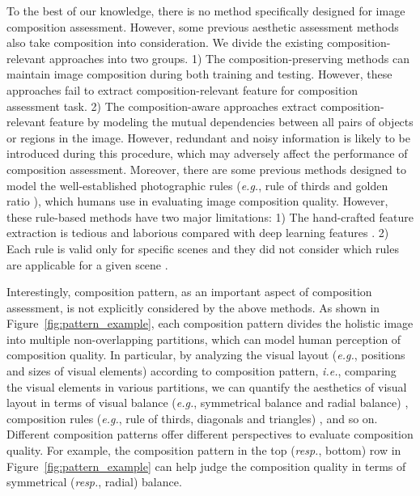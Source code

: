 \documentclass{bmvc2k}
\begin{document}
To the best of our knowledge, there is no method specifically designed for image composition assessment. However, some previous aesthetic assessment methods also take composition into consideration. We divide the existing composition-relevant approaches into two groups. 1) The composition-preserving methods \cite{Mai2016CompositionPreservingDP, Chen2020AdaptiveFD} can maintain image composition during both training and testing. However, these approaches fail to extract composition-relevant feature for composition assessment task. 2) The composition-aware approaches \cite{Liu2020CompositionAwareIA, Ma2017ALampAL, Wang2019ModelingHP} extract composition-relevant feature by modeling the mutual dependencies between all pairs of objects or regions in the image. However, redundant and noisy information is likely to be introduced during this procedure, which may adversely affect the performance of composition assessment. Moreover, there are some previous methods \cite{wu2017high,Dhar2011HighLD,Bhattacharya2010AFF,wu2010good,Tang2013ContentBasedPQ,liu2010optimizing} designed to model the well-established photographic rules (\emph{e.g.}, rule of thirds and golden ratio \cite{joshi2011aesthetics}), which humans use in evaluating image composition quality. 
\textcolor[rgb]{0,0,0}{However, these rule-based methods have two major limitations: 1) The hand-crafted feature extraction is tedious and laborious compared with deep learning features \cite{li2020novel}. 2) Each rule is valid only for specific scenes and they did not consider which rules are applicable for a given scene \cite{su2021camera}. }

Interestingly, composition pattern, as an important aspect of composition assessment, is not explicitly considered by the above methods. As shown in Figure~\ref{fig:pattern_example}, each composition pattern divides the holistic image into multiple non-overlapping partitions, which can model human perception of composition quality. In particular, by analyzing the visual layout (\emph{e.g.}, positions and sizes of visual elements) according to composition pattern, \emph{i.e.}, comparing the visual elements in various partitions, we can quantify the aesthetics of visual layout in terms of visual balance (\emph{e.g.}, symmetrical balance and radial balance) \cite{jahanian2015learning, lok2004evaluation,Lee2017SemanticLD}, composition rules (\emph{e.g.}, rule of thirds, diagonals and triangles) \cite{thommes2018instagram,Lee2018PhotographicCC}, and so on. Different composition patterns offer different perspectives to evaluate composition quality. 
For example, the composition pattern in the top (\emph{resp.}, bottom) row in Figure~\ref{fig:pattern_example} can help judge the composition quality in terms of symmetrical (\emph{resp.}, radial) balance.
\end{document}
